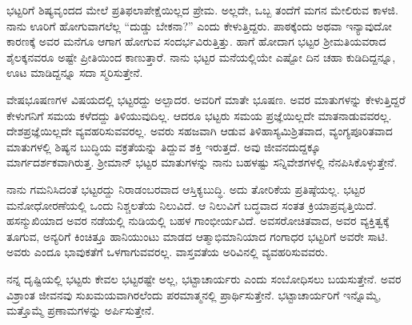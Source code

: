 {ಭಟ್ಟರಿಗೆ ಶಿಷ್ಯವೃಂದದ ಮೇಲೆ ಪ್ರತಿಫಲಾಪೇಕ್ಷೆಯಿಲ್ಲದ ಪ್ರೇಮ. ಅಲ್ಲದೇ, ಒಬ್ಬ ತಂದೆಗೆ ಮಗನ ಮೇಲಿರುವ ಕಾಳಜಿ. ನಾನು ಊರಿಗೆ ಹೋಗುವಾಗಲೆಲ್ಲ “ದುಡ್ಡು ಬೇಕನಾ?” ಎಂದು ಕೇಳುತ್ತಿದ್ದರು. ಪಾಠಕ್ಕೆಂದು ಅಥವಾ ಇನ್ಯಾವುದೋ ಕಾರಣಕ್ಕೆ ಅವರ ಮನೆಗೂ ಆಗಾಗ ಹೋಗುವ ಸಂದರ್ಭವಿರುತ್ತಿತ್ತು. ಹಾಗೆ ಹೋದಾಗ ಭಟ್ಟರ ಶ್ರೀಮತಿಯವರಾದ ಶೈಲಕ್ಕನವರೂ ಅಷ್ಟೇ ಪ್ರೀತಿಯಿಂದ ಕಾಣುತ್ತಾರೆ. ನಾನು ಭಟ್ಟರ ಮನೆಯಲ್ಲಿಯೇ ಎಷ್ಟೋ ದಿನ ಚಹಾ ಕುಡಿದಿದ್ದನ್ನೂ, ಊಟ ಮಾಡಿದ್ದನ್ನೂ ಸದಾ ಸ್ಮರಿಸುತ್ತೇನೆ.

ವೇಷಭೂಷಣಗಳ ವಿಷಯದಲ್ಲಿ ಭಟ್ಟರದ್ದು ಅಲ್ಪಾದರ. ಅವರಿಗೆ ಮಾತೇ ಭೂಷಣ. ಅವರ ಮಾತುಗಳನ್ನು ಕೇಳುತ್ತಿದ್ದರೆ ಕೇಳುಗನಿಗೆ ಸಮಯ ಕಳೆದದ್ದು ತಿಳಿಯುವುದಿಲ್ಲ. ಆದರೂ ಭಟ್ಟರು ಸಮಯ ಪ್ರಜ್ಞೆಯಿಲ್ಲದೇ ಮಾತನಾಡುವವರಲ್ಲ. ದೇಶಪ್ರಜ್ಞೆ\-ಯಿಲ್ಲದೇ ವ್ಯವಹರಿಸುವವರಲ್ಲ. ಅವರು ಸಹಜವಾಗಿ ಆಡುವ ತಿಳಿಹಾಸ್ಯಮಿಶ್ರಿತವಾದ, ವ್ಯಂಗ್ಯಪೂರಿತವಾದ ಮಾತುಗಳಲ್ಲಿ ಶಿಷ್ಯನ ಬುದ್ಧಿಯ ವಕ್ರತೆಯನ್ನು ತಿದ್ದುವ ಶಕ್ತಿ ಇರುತ್ತದೆ. ಅವು ಜೀವನದುದ್ದಕ್ಕೂ ಮಾರ್ಗದರ್ಶಕವಾಗಿರುತ್ತ. ಶ್ರೀಮಾನ್  ಭಟ್ಟರ ಮಾತುಗಳನ್ನು ನಾನು ಬಹಳಷ್ಟು ಸನ್ನಿವೇಶಗಳಲ್ಲಿ  ನೆನಪಿಸಿಕೊಳ್ಳುತ್ತೇನೆ.

ನಾನು ಗಮನಿಸಿದಂತೆ ಭಟ್ಟರದ್ದು ನಿರಾಡಂಬರವಾದ ಆಸ್ತಿಕ್ಯಬುದ್ಧಿ. ಅದು ತೋರಿಕೆಯ ಪ್ರತಿಷ್ಠೆಯಲ್ಲ. ಭಟ್ಟರ ಮನೋಧೋರಣೆಯಲ್ಲಿ ಒಂದು ನಿಶ್ಚಲತೆಯ ನಿಲುವಿದೆ. ಆ ನಿಲುವಿಗೆ ಬದ್ಧವಾದ ಸಂತತ ಕ್ರಿಯಾಪ್ರವೃತ್ತಿಯಿದೆ. ಹಸನ್ಮುಖಿಯಾದ ಅವರ ನಡೆಯಲ್ಲಿ ನುಡಿಯಲ್ಲಿ ಬಹಳ ಗಾಂಭೀರ್ಯವಿದೆ. ಅವಸರೋಚಿತವಾದ, ಅವರ \hbox{ವ್ಯಕ್ತಿತ್ವಕ್ಕೆ} ತೂಗುವ, ಅನ್ಯರಿಗೆ ಕಿಂಚಿತ್ತೂ ಹಾನಿಯುಂಟು ಮಾಡದ ಆತ್ಮಾಭಿಮಾನಿಯಾದ \hbox{ಗಂಗಾಧರ} ಭಟ್ಟರಿಗೆ ಅವರೇ ಸಾಟಿ. ಅವರು ಎಂದೂ ಭಾವುಕತೆಗೆ ಒಳಗಾಗುವವರಲ್ಲ. ವಾಸ್ತವತೆಯ ಅರಿವಿನಲ್ಲಿ ವ್ಯವಹರಿಸುವವರು.

ನನ್ನ ದೃಷ್ಟಿಯಲ್ಲಿ ಭಟ್ಟರು ಕೇವಲ ಭಟ್ಟರಷ್ಟೇ ಅಲ್ಲ, ಭಟ್ಟಾಚಾರ್ಯರು ಎಂದು ಸಂಬೋಧಿಸಲು ಬಯಸುತ್ತೇನೆ. ಅವರ ವಿಶ್ರಾಂತ ಜೀವನವು ಸುಖಮಯವಾಗಿರಲೆಂದು ಪರಮಾತ್ಮನಲ್ಲಿ ಪ್ರಾರ್ಥಿಸುತ್ತೇನೆ. ಭಟ್ಟಾಚಾರ್ಯರಿಗೆ ಇನ್ನೊಮ್ಮೆ, ಮತ್ತೊಮ್ಮೆ ಪ್ರಣಾಮಗಳನ್ನು ಅರ್ಪಿಸುತ್ತೇನೆ.

\articleend	
}
